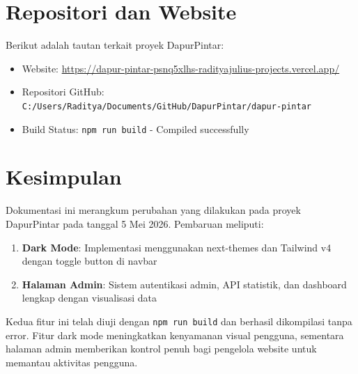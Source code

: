 \documentclass[12pt, a4paper]{article}
\begin{document}
\section{Repositori dan Website}
Berikut adalah tautan terkait proyek DapurPintar:
\begin{itemize}
  \item Website: \url{https://dapur-pintar-psnq5xlhs-radityajulius-projects.vercel.app/}
  \item Repositori GitHub: \texttt{C:/Users/Raditya/Documents/GitHub/DapurPintar/dapur-pintar}
  \item Build Status: \texttt{npm run build} - Compiled successfully
\end{itemize}

\section{Kesimpulan}
Dokumentasi ini merangkum perubahan yang dilakukan pada proyek DapurPintar pada tanggal 5 Mei 2026. Pembaruan meliputi:
\begin{enumerate}
  \item \textbf{Dark Mode}: Implementasi menggunakan next-themes dan Tailwind v4 dengan toggle button di navbar
  \item \textbf{Halaman Admin}: Sistem autentikasi admin, API statistik, dan dashboard lengkap dengan visualisasi data
\end{enumerate}

Kedua fitur ini telah diuji dengan \texttt{npm run build} dan berhasil dikompilasi tanpa error. Fitur dark mode meningkatkan kenyamanan visual pengguna, sementara halaman admin memberikan kontrol penuh bagi pengelola website untuk memantau aktivitas pengguna.
\end{document}
